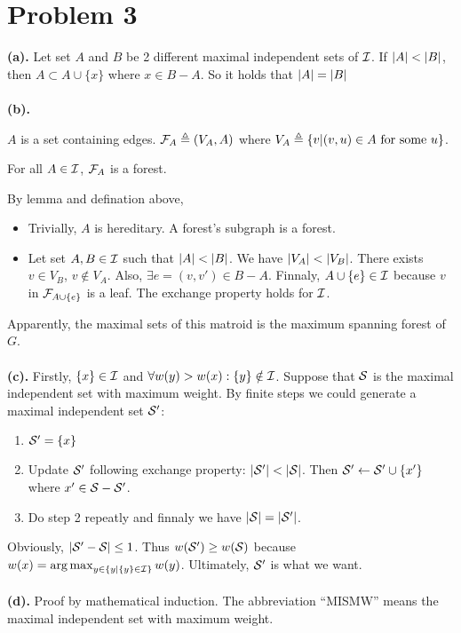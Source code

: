 \documentclass{article}
\begin{document}
\section*{Problem 3}
\textbf{(a).}
Let set $A$ and $B$ be 2 different maximal independent sets of $\mathcal{I}$. 
If $\qty|A|<\qty|B|$,  then $A\subset A\cup\{x\}$ where  $x\in B-A$.
So it holds that $\qty|A|=\qty|B|$
\\\\
\textbf{(b).}
\begin{defi}
	$A$ is a set containing edges.  $\mathcal{F}_A\triangleq (V_A,A)$ where $V_A\triangleq\{v|(v,u)\in A \text{ for some }u\}$.
\end{defi}
\begin{lemma}
	For all $A\in\mathcal{I}$,  $\mathcal{F}_A$ is a forest.
\end{lemma}
By lemma and defination above,
\begin{itemize}
	\item 
		Trivially, $A$ is hereditary. A forest's subgraph is a forest.
	\item
		Let set $A,B\in\mathcal{I}$ such that  $\qty|A|<\qty|B|$.
		We have $\qty|V_A|<\qty|V_B|$. There exists $v\in V_B$, $v\notin V_A$. Also, $\exists e=(v,v')\in B-A$. Finnaly, $A\cup\{e\}\in\mathcal{I}$ because $v$ in $\mathcal{F}_{A\cup\{e\}}$ is a leaf. The exchange property holds for $\mathcal{I}$.
\end{itemize}
Apparently, the maximal sets of this matroid is the maximum spanning forest of $G$.
\\\\
\textbf{(c).}
Firstly, $\{x\}\in\mathcal{I}$ and $\forall w(y)>w(x):\{y\}\notin\mathcal{I}$. Suppose that $\mathcal{S}$ is the maximal independent set with maximum weight. By finite steps we could generate a maximal independent set $\mathcal{S}'$:
\begin{enumerate}
	\item $\mathcal{S}'=\{x\}$ 
	\item Update  $\mathcal{S}'$ following exchange property: $\qty|\mathcal{S}'|<\qty|\mathcal{S}|$. Then $\mathcal{S}'\gets \mathcal{S}'\cup\{x'\}$ where $x'\in\mathcal{S}-\mathcal{S}'$.
	\item  Do step 2 repeatly and finnaly we have $\qty|\mathcal{S}|=\qty|\mathcal{S}'|$.
\end{enumerate} 
Obviously, $\qty|\mathcal{S}'-\mathcal{S}|\le 1$. Thus $w(\mathcal{S}')\ge w(\mathcal{S})$ because $w(x)=\mathop{\arg\max}_{y\in\{y|\{y\}\in\mathcal{I}\}}w(y)$. Ultimately, $\mathcal{S}'$ is what we want.
\\\\
\textbf{(d).}
Proof by mathematical induction. The abbreviation ``MISMW'' means the maximal independent set with maximum weight.
\end{document}
